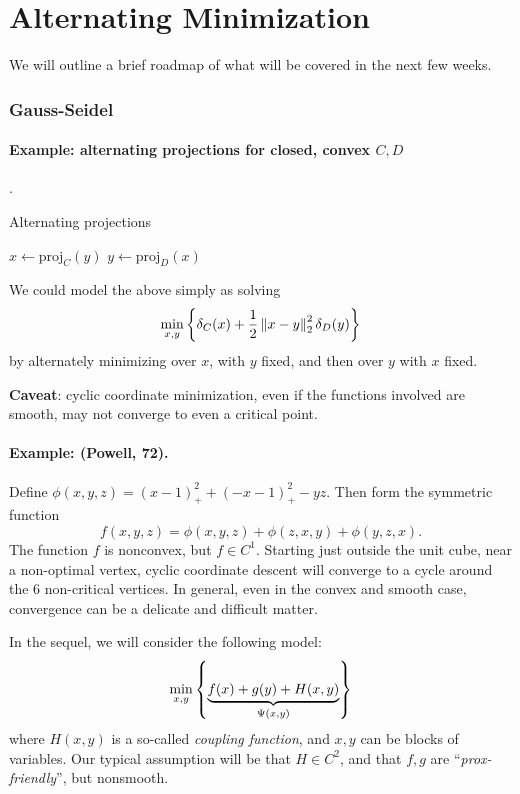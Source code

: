 \section{Alternating Minimization}
We will outline a brief roadmap of what will be covered in the next few weeks.

\subsubsection{Gauss-Seidel}
\paragraph{Example: alternating projections for closed, convex $C, D$}.
\begin{algorithm}
	\caption{Alternating projections}
	\begin{algorithmic}
		\Repeat
			\State $x \gets \mathrm{proj}_C(y) $
			\State $y \gets \mathrm{proj}_D(x) $
	\end{algorithmic}
	\label{alg:alternating-projections}
\end{algorithm}
We could model the above simply as solving
\[
	\min_{x, y} \left\{  \delta_C(x) +
		\frac{1}{2} \left \| x - y \right \|_2^2
	\delta_D(y)  \right\}
\]
by alternately minimizing over $x$, with $y$ fixed, and then over $y$ with $x$
fixed.

\textbf{Caveat}: cyclic coordinate minimization, even if the functions involved
are smooth, may not converge to even a critical point.

\paragraph{Example: (Powell, 72).}
Define $\phi(x, y, z) = (x - 1)^2_+ + (-x - 1)^2_+ - yz$. Then form the
symmetric function
\[
	f(x, y, z) = \phi(x, y, z) + \phi(z, x, y) + \phi(y, z, x).
\]
The function $f$ is nonconvex, but $f \in C^1$. Starting just outside the unit
cube, near a non-optimal vertex, cyclic coordinate descent will converge to a
cycle around the $6$ non-critical vertices.
In general, even in the convex and smooth case, convergence can be a delicate
and difficult matter.

In the sequel, we will consider the following model:
\[
	\min_{x, y} \left\{ \underbrace{f(x) + g(y) + H(x, y)}_{\Psi(x, y)} \right\}
\]
where $H(x,y)$ is a so-called \textit{coupling function}, and $x, y$ can be
blocks of variables. Our typical assumption will be that $H \in C^2$, and that
$f, g$ are ``\textit{prox-friendly}'', but nonsmooth.

